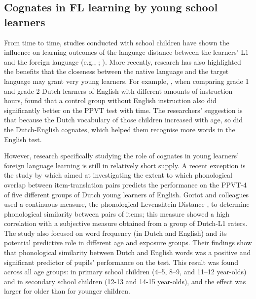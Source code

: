 \documentclass[output=paper,modfonts,nonflat,newtxmath]{langsci/langscibook}
\begin{document}
\subsection{{Cognates} {in} {FL} {learning} {by} {young} {school} {learners}}

{From time to time, studies conducted with school children have shown the influence on learning outcomes of the language distance between the learners’ L1 and the foreign language (e.g., \citealt{BildSwain1989}; \citealt{DYdewallevandePoel1999}). More recently, research has also highlighted the benefits that the closeness between the native language and the target language may grant very young learners. For example, \citet{UnsworthEtAl2015}, when comparing grade 1 and grade 2 Dutch learners of English with different amounts of instruction hours, found that a control group without English instruction also did significantly better on the PPVT test with time. The researchers’ suggestion is that because the Dutch vocabulary of those children increased with age, so did the Dutch-English cognates, which helped them recognise more words in the English test.}

{However, research specifically studying the role of cognates in young learners’ foreign language learning is still in relatively short supply. A recent exception is the study by \citet{GoriotEtAl2018} which aimed at investigating the extent to which phonological overlap between item-translation pairs predicts the performance on the PPVT-4 of five different groups of Dutch young learners of English. Goriot and colleagues used a continuous measure, the phonological Levenshtein Distance \citep{SchepensEtAl2013}, to determine phonological similarity between pairs of items; this measure showed a high correlation with a subjective measure obtained from a group of Dutch-L1 raters. The study also focused on word frequency (in Dutch and English) and its potential predictive role in different age and exposure groups. Their findings show that phonological similarity between Dutch and English words was a positive and significant predictor of pupils’ performance on the test. This result was found across all age groups: in primary school children (4--5, 8--9, and 11--12 year-olds) and in secondary school children (12-13 and 14-15 year-olds), and the effect was larger for older than for younger children.}
\end{document}
